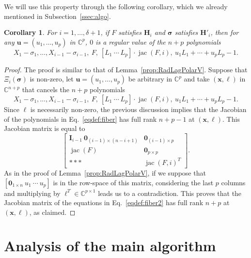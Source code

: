 \documentclass[12pt]{article}
\def\xb{{\bm x}}
\DeclareMathOperator{\jac}{jac}
\def\C{\mathbb{C}}
\newtheorem{corollary}[theorem]{Corollary}
\begin{document}
We will use this property through the following corollary, which we
already mentioned in Subsection~\ref{ssec:algo}.
\begin{corollary}\label{coro:8}
 For $i=1,\dots,\delta+1$, if $F$ satisfies $\bm H_i$ and $\bm \sigma$
 satisfies $\bm H'_i$, then for any $\bm u=(u_1,\dots,u_p)$
 in $\C^p$, $0$ is a regular value of the $n+p$ polynomials
  \begin{equation*}
    X_1 - \sigma_1, \dots, X_{i-1} - \sigma_{i-1},\ F,\ [L_1~\cdots~L_p]\cdot \jac(F, i),\ u_1 L_1 + \cdots + u_p L_p -1.
  \end{equation*}
\end{corollary}
\begin{proof}
  The proof is similar to that of Lemma~\ref{prop:RadLagPolarV}. Suppose that
  $\Xi_{i}(\bm \sigma)$ is non-zero, let $\bm u = (u_1,\dots,u_p)$ be
  arbitrary in $\C^p$ and take $(\xb,\bm \ell)$ in $\C^{n+p}$ that
  cancels the $n+p$ polynomials
  \begin{equation}\label{eqdef:fiber2} 
    X_1 - \sigma_1, \dots, X_{i-1} - \sigma_{i-1},\ F,\ [L_1~\cdots~L_p]\cdot \jac(F, i),\ u_1 L_1 + \cdots + u_p L_p -1. 
  \end{equation}
  Since $\bm\ell$ is necessarily non-zero, the previous discussion
  implies that the Jacobian of the polynomials in
  Eq.~\eqref{eqdef:fiber} has full rank $n+p-1$ at $(\xb,\bm\ell)$.
  This Jacobian matrix is equal to
  \[
  \left[ 
    \begin{array}{cc}
      \bm I_{i-1} ~ \bm 0_{(i-1) \times (n-i+1)} & \bm 0_{(i-1) \times p}\\
      \jac(F) & {\bm 0}_{p \times p}\\
      *** &  \jac(F,i)^T 
    \end{array}
    \right].
  \]
  As in the proof of Lemma~\ref{prop:RadLagPolarV}, if we suppose that
  $[ {\bm 0}_{1 \times n} ~ u_1~ \cdots ~u_p]$ is in the row-space of
  this matrix, considering the last $p$ columns and multiplying by
  $\bm\ell^T \in \C^{p\times 1}$ leads us to a contradiction. This
  proves that the Jacobian matrix of the equations in
  Eq.~\eqref{eqdef:fiber2} has full rank $n+p$ at $(\bm x,\bm \ell)$,
  as claimed.
\end{proof}



\section{Analysis of the main algorithm}\label{sec:analysis}
\end{document}
